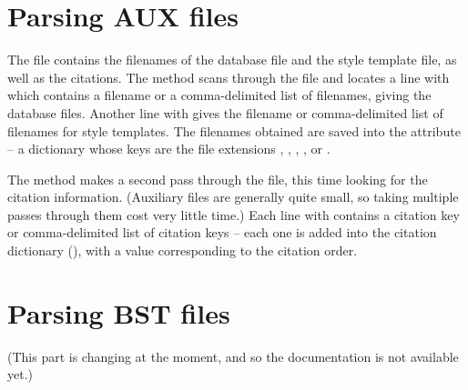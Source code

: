 \documentclass[letterpaper,10pt,english]{sphinxmanual}
\begin{document}
\section{Parsing AUX files}
\label{developer_guide:parsing-aux-files}
The  file contains the filenames of the  database file and the  style template file, as well as the citations. The  method scans through the  file and locates a line with  which contains a filename or a comma-delimited list of filenames, giving the database files. Another line with  gives the filename or comma-delimited list of filenames for style templates. The filenames obtained are saved into the  attribute -- a dictionary whose keys are the file extensions , , , , or .

The  method makes a second pass through the  file, this time looking for the citation information. (Auxiliary files are generally quite small, so taking multiple passes through them cost very little time.) Each line with  contains a citation key or comma-delimited list of citation keys -- each one is added into the citation dictionary (), with a value corresponding to the citation order.


\section{Parsing BST files}
\label{developer_guide:parsing-bst-files}
(This part is changing at the moment, and so the documentation is not available yet.)
\end{document}
